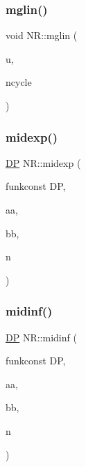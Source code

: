 \mbox{\label{namespaceNR_a462e1290733dd6e89382065234a02f91}} 
\subsubsection{\texorpdfstring{mglin()}{mglin()}}
{\footnotesize\ttfamily void N\+R\+::mglin (\begin{DoxyParamCaption}\item[{\mbox{\hyperlink{namespaceNR_ad1513aa4697878ed3bff0b8b3c9dd910}{Mat\+\_\+\+I\+O\+\_\+\+DP}} \&}]{u,  }\item[{const int}]{ncycle }\end{DoxyParamCaption})}

\mbox{\label{namespaceNR_ab0417b8e3403a5388e1335cf434a9f97}} 
\subsubsection{\texorpdfstring{midexp()}{midexp()}}
{\footnotesize\ttfamily \mbox{\hyperlink{namespaceNR_af6ff762dd605ff477b8e52387253a02a}{DP}} N\+R\+::midexp (\begin{DoxyParamCaption}\item[{\mbox{\hyperlink{namespaceNR_af6ff762dd605ff477b8e52387253a02a}{DP}} }]{funkconst DP,  }\item[{const \mbox{\hyperlink{namespaceNR_af6ff762dd605ff477b8e52387253a02a}{DP}}}]{aa,  }\item[{const \mbox{\hyperlink{namespaceNR_af6ff762dd605ff477b8e52387253a02a}{DP}}}]{bb,  }\item[{const int}]{n }\end{DoxyParamCaption})}

\mbox{\label{namespaceNR_ab1e98fd1024d49b2e58d93057dd0a7f1}} 
\subsubsection{\texorpdfstring{midinf()}{midinf()}}
{\footnotesize\ttfamily \mbox{\hyperlink{namespaceNR_af6ff762dd605ff477b8e52387253a02a}{DP}} N\+R\+::midinf (\begin{DoxyParamCaption}\item[{\mbox{\hyperlink{namespaceNR_af6ff762dd605ff477b8e52387253a02a}{DP}} }]{funkconst DP,  }\item[{const \mbox{\hyperlink{namespaceNR_af6ff762dd605ff477b8e52387253a02a}{DP}}}]{aa,  }\item[{const \mbox{\hyperlink{namespaceNR_af6ff762dd605ff477b8e52387253a02a}{DP}}}]{bb,  }\item[{const int}]{n }\end{DoxyParamCaption})}


